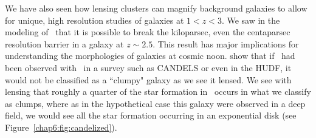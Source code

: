We have also seen how lensing clusters can magnify background galaxies to allow for unique, high resolution studies of galaxies at $1<z<3$. We saw in the modeling of \cluster\ that it is possible to break the kiloparsec, even the centaparsec resolution barrier in a galaxy at $z\sim2.5$. This result has major implications for understanding the morphologies of galaxies at cosmic noon. \citet{Rigby:2017qy} show that if \giantarc\ had been observed with \hst\ in a survey such as CANDELS or even in the HUDF, it would not be classified as a ``clumpy" galaxy as we see it lensed. We see with lensing that roughly a quarter of the star formation in \giantarc\ occurs in what we classify as clumps, where as in the hypothetical case this galaxy were observed in a deep field, we would see all the star formation occurring in an exponential disk (see Figure~\ref{chap6:fig:candelized}).

